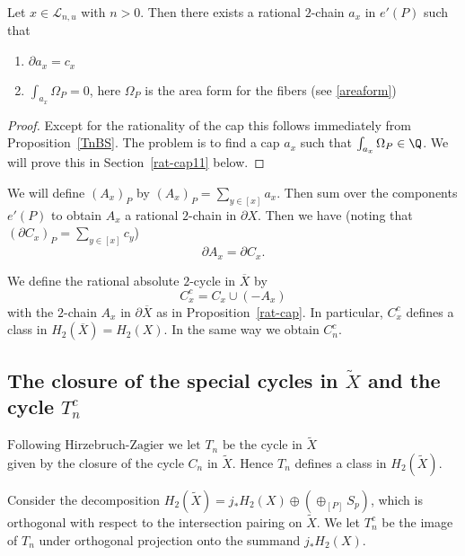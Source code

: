 \begin{proposition}\label{rat-cap}
Let $x \in \mathcal{L}_{n,u}$ with $n>0$. Then there exists a rational $2$-chain $a_x$ in $e'(P)$ such that
\begin{enumerate}
\item $\partial a_x = c_x$
\item $\int_{a_x} \Omega_P = 0$, here $\Omega_P$ is the area form for the fibers (see \eqref{areaform}) 
\end{enumerate}

\end{proposition}
 

\begin{proof}

Except for the rationality of the cap this follows immediately from Proposition~\ref{TnBS}. The problem is to find a cap $a_x$ such that $\int_{a_x} \Omega_P \in \Q$. We will prove this in Section~\ref{rat-cap11} below. 
\end{proof}

We will define $(A_x)_P$ by $(A_x)_P = \sum_{y \in [x]} a_x$. Then sum over the components $e'(P)$ to obtain $A_x$ a rational $2$-chain 
in $\partial X$. Then we have (noting that $(\partial C_x)_P = \sum_{y \in [x]} c_y$)
\[
\partial A_x = \partial C_x.
\]




\begin{definition}
We define the rational absolute $2$-cycle in $\overline{X}$ by 
\[
C_x^c = C_x \cup (-A_x)
\]
with the $2$-chain $A_x$  in $\partial \overline{X}$ as in Proposition~\ref{rat-cap}. In particular, $C_x^c$ defines a class in $H_2(\overline{X}) = H_2(X)$. In the same way we obtain $C_n^c$. 
\end{definition}


\subsection{The closure of the special cycles in $\tilde{X}$ and the cycle $T_n^c$}

$\text{Following Hirzebruch-Zagier we let $T_n$ be the cycle in $\tilde{X}$}$\\ given by the closure of the cycle $C_n$ in $\tilde{X}$. Hence $T_n$ defines a class in $H_2(\tilde{X})$.


\begin{definition}
Consider the decomposition $H_2(\tilde{X}) = j_{\ast} H_2(X) \oplus \left( \oplus_{[P]} S_{p
} \right)$, which is orthogonal with respect to the intersection pairing on $\tilde{X}$. We let $T_n^c$ be the image of $T_n$ under orthogonal projection onto the summand $j_{\ast} H_2(X)$.
\end{definition}

